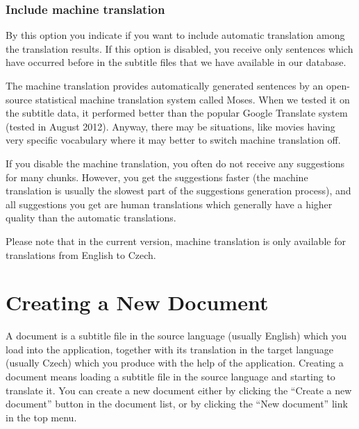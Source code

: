 \subsubsection{Include machine translation}

By this option you indicate if you want to include automatic translation among the translation results. If this option is disabled, you receive only sentences which have occurred before in the subtitle files that we have available in our database.

The machine translation provides automatically generated sentences by an open-source statistical machine translation system called Moses. When we tested it on the subtitle data, it performed better than the popular Google Translate system (tested in August 2012). Anyway, there may be situations, like movies having very specific vocabulary where it may better to switch machine translation off.

If you disable the machine translation, you often do not receive any suggestions for many chunks. However, you get the suggestions faster (the machine translation is usually the slowest part of the suggestions generation process), and all suggestions you get are human translations which generally have a higher quality than the automatic translations.

Please note that in the current version, machine translation is only available for translations from English to Czech.

\section{Creating a New Document}

A document is a subtitle file in the source language (usually English) which you load into the application, together with its translation in the target language (usually Czech) which you produce with the help of the application. Creating a document means loading a subtitle file in the source language and starting to translate it. You can create a new document either by clicking the ``Create a new document'' button in the document list, or by clicking the ``New document'' link in the top menu.

